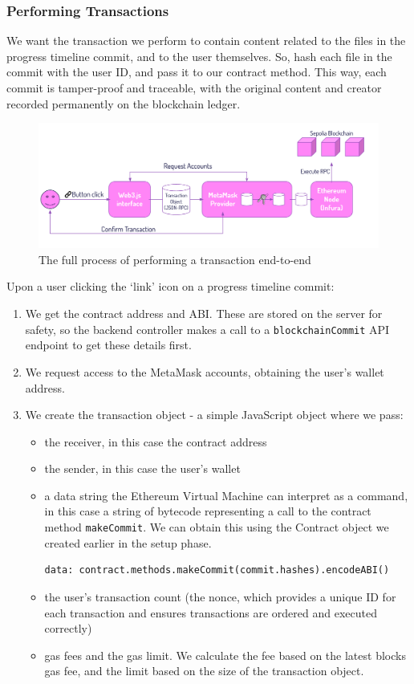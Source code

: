 \documentclass[12pt,a4paper]{article}
\begin{document}
\subsubsection{Performing Transactions}
We want the transaction we perform to contain content related to the files in the progress timeline commit, and to the user themselves. So, hash each file in the commit with the user ID, and pass it to our contract method. This way, each commit is tamper-proof and traceable, with the original content and creator recorded permanently on the blockchain ledger.
\begin{figure}[H]
    \centering
    \includegraphics[scale=0.6]{bchain.png}
    \caption{The full process of performing a transaction end-to-end}
\end{figure}
Upon a user clicking the `link' icon on a progress timeline commit:
\begin{enumerate}
    \item We get the contract address and ABI. These are stored on the server for safety, so the backend controller makes a call to a \verb|blockchainCommit| API endpoint to get these details first. 
    \item We request access to the MetaMask accounts, obtaining the user's wallet address.
    \item We create the transaction object - a simple JavaScript object where we pass:
    \begin{itemize}
        \item the receiver, in this case the contract address
        \item the sender, in this case the user's wallet
        \item a data string the Ethereum Virtual Machine can interpret as a command, in this case a string of bytecode representing a call to the contract method \verb|makeCommit|. We can obtain this using the Contract object we created earlier in the setup phase.
        \begin{lstlisting}
data: contract.methods.makeCommit(commit.hashes).encodeABI()
        \end{lstlisting}
        \item the user's transaction count (the nonce, which provides a unique ID for each transaction and ensures transactions are ordered and executed correctly)
        \item gas fees and the gas limit. We calculate the fee based on the latest blocks gas fee, and the limit based on the size of the transaction object.
    \end{itemize}
\end{enumerate}
\end{document}
